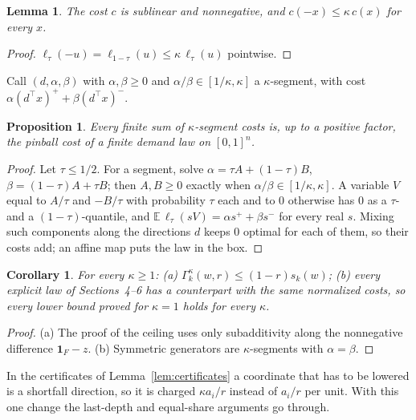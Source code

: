 \documentclass[11pt,a4paper]{article}
\newtheorem{proposition}[theorem]{Proposition}
\newtheorem{lemma}[theorem]{Lemma}
\newtheorem{corollary}[theorem]{Corollary}
\theoremstyle{remark}
\newcommand{\one}{\mathbf 1}
\newcommand{\E}{\mathbb E}
\begin{document}
\begin{lemma}\label{lem:quasi}
The cost $c$ is sublinear and nonnegative, and $c(-x)\le\kappa\,c(x)$ for
every $x$.
\end{lemma}

\begin{proof}
$\ell_\tau(-u)=\ell_{1-\tau}(u)\le\kappa\,\ell_\tau(u)$ pointwise.
\end{proof}

Call $(d,\alpha,\beta)$ with $\alpha,\beta\ge0$ and
$\alpha/\beta\in[1/\kappa,\kappa]$ a $\kappa$-segment, with cost
$\alpha(d^\top x)^++\beta(d^\top x)^-$.

\begin{proposition}\label{prop:segments}
Every finite sum of $\kappa$-segment costs is, up to a positive factor, the
pinball cost of a finite demand law on $[0,1]^n$.
\end{proposition}

\begin{proof}
Let $\tau\le1/2$. For a segment, solve $\alpha=\tau A+(1-\tau)B$,
$\beta=(1-\tau)A+\tau B$; then $A,B\ge0$ exactly when
$\alpha/\beta\in[1/\kappa,\kappa]$. A variable $V$ equal to $A/\tau$ and
$-B/\tau$ with probability $\tau$ each and to $0$ otherwise has $0$ as a
$\tau$- and a $(1-\tau)$-quantile, and $\E\,\ell_\tau(sV)=\alpha s^++\beta s^-$
for every real $s$. Mixing such components along the directions $d$ keeps $0$
optimal for each of them, so their costs add; an affine map puts the law in
the box.
\end{proof}

\begin{corollary}\label{cor:asym}
For every $\kappa\ge1$: (a) $\Gamma_k^\kappa(w,r)\le(1-r)s_k(w)$; (b) every
explicit law of Sections~4--6 has a counterpart with the same normalized costs,
so every lower bound proved for $\kappa=1$ holds for every $\kappa$.
\end{corollary}

\begin{proof}
(a) The proof of the ceiling uses only subadditivity along the nonnegative
difference $\one_F-z$. (b) Symmetric generators are $\kappa$-segments with
$\alpha=\beta$.
\end{proof}

In the certificates of Lemma~\ref{lem:certificates} a coordinate that has to
be lowered is a shortfall direction, so it is charged $\kappa a_i/r$ instead of
$a_i/r$ per unit. With this one change the last-depth and equal-share
arguments go through.
\end{document}
